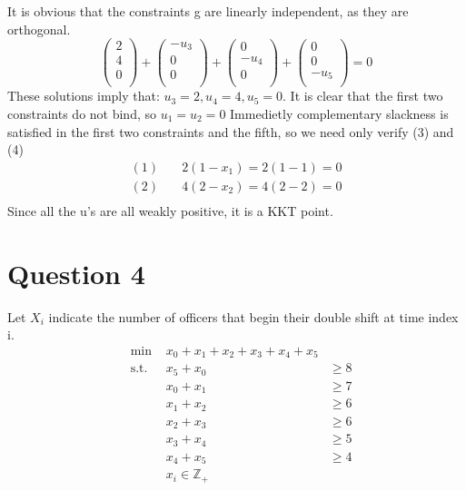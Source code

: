 \documentclass[10pt, letterpaper]{paper}
\begin{document}
	It is obvious that the constraints g are linearly independent, as they are orthogonal.
\[ 
\left ( {\begin{array}{c}
	2\\
	4\\
	0\\
	\end{array} } \right ) + \left ( {\begin{array}{c}
	-u_3\\
	0\\
	0\\
	\end{array} } \right ) + \left ( {\begin{array}{c}
	0\\
	-u_4\\
	0\\
	\end{array} } \right ) + \left ( {\begin{array}{c}
	0\\
	0\\
	-u_5\\
	\end{array} } \right ) = 0
\]
These solutions imply that: $u_3 = 2, u_4 = 4, u_5 = 0$. It is clear that the first two constraints do not bind, so $u_1 = u_2 = 0$
Immedietly complementary slackness is satisfied in the first two constraints and the fifth, so we need only verify (3) and (4)
\begin{align*}
(1) \quad& 2( 1 - x_1 ) = 2( 1 - 1 ) = 0\\
(2) \quad& 4(2-x_2 ) = 4( 2-2) = 0\\
\end{align*}
Since all the u's are all weakly positive, it is a KKT point.

\section*{Question 4}
Let $X_i$ indicate the number of officers that begin their double shift at time index i.
\begin{equation*}
\begin{alignedat}{3}
&\text{min }&x_0 + x_1 + x_2 + x_3 + x_4 + x_5&\\
&\text{s.t. } &x_5 + x_0 &\geq 8\\
& &x_0 + x_1 &\geq 7\\
& &x_1 + x_2 &\geq 6\\
& &x_2 + x_3 &\geq 6\\
& &x_3 + x_4 &\geq 5\\
& &x_4 + x_5 &\geq 4\\
& &x_i \in \mathbb{Z}_+ &\\
\end{alignedat}
\end{equation*}
\end{document}

